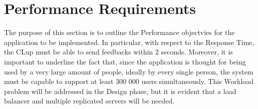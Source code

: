 \section{Performance Requirements}

The purpose of this section is to outline the Performance objectvies for the application to be implemented. In particular, with respect to the Response Time, the CLup must be able to send feedbacks within 2 seconds. Moreover, it is important to underline the fact that, since the application is thought for being used by a very large amount of people, ideally by every single person, the system must be capable to support at least 300 000 users simultaneously. This Workload problem will be addressed in the Design phase, but it is evident that a load balancer and multiple replicated servers will be needed.


 
 